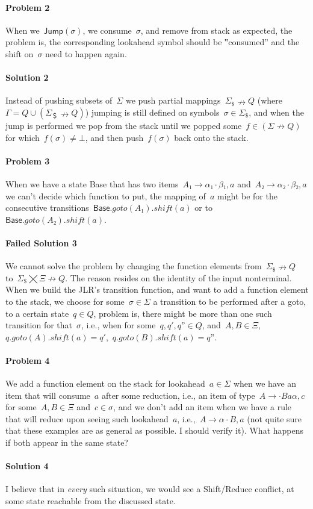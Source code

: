 \paragraph{Problem 2} When we~$\textsf{Jump}(σ)$, we consume~$σ$, and remove
from stack as expected, the problem is, the corresponding lookahead symbol
should be ‟consumed” and the shift on~$σ$ need to happen again.

\paragraph{Solution 2} Instead of pushing subsets of~$Σ$ we push partial
mappings~$Σ_{\$}↛Q$ (where~$Γ=Q∪(Σ_{＄}↛Q)$) jumping is still defined
on symbols~$σ∈Σ_{\$}$, and when the jump is performed we pop from the stack
until we popped some~$f∈(Σ↛Q)$ for which~$f(σ)≠⊥$, and then push~$f(σ)$ back onto the stack.

\paragraph{Problem 3} When we have a state \textsf{Base} that has
two items~$A₁→α₁·β₁,a$ and~$A₂→α₂·β₂,a$ we can't decide which function to put,
the mapping of~$a$ might be for the consecutive
transitions~$\textsf{Base}.goto(A₁).shift(a)$ or to~$\textsf{Base}.goto(A₂).shift(a)$.

\paragraph{Failed Solution 3} We cannot solve the problem by changing the function elements from~$Σ_\$↛Q$
to~$Σ_\$⨉Ξ↛Q$. The reason resides on the identity of the input nonterminal.
When we build the JLR's transition function, and want to add a function element to the stack, we choose for some~$σ∈Σ$
a transition to be performed after a goto, to a certain state~$q∈Q$, problem is, there might be more than one such transition
for that~$σ$, i.e., when for some~$q,q',q”∈Q$, and~$A,B∈Ξ$,~$q.goto(A).shift(a)=q'$,~$q.goto(B).shift(a)=q”$.

\paragraph{Problem 4} We add a function element on the stack for lookahead~$a∈Σ$
when we have an item that will consume~$a$ after some reduction,
i.e., an item of type~$A→·Baα,c$ for some~$A,B∈Ξ$ and~$c∈σ$,
and we don't add an item when we have a rule that will reduce
upon seeing such lookahead~$a$, i.e.,~$A→α·B, a$
(not quite sure that these examples are as general as possible. I should verify it).
What happens if both appear in the same state?

\paragraph{Solution 4} I believe that in \emph{every} such situation,
we would see a Shift/Reduce conflict, at some state reachable from the discussed state.
